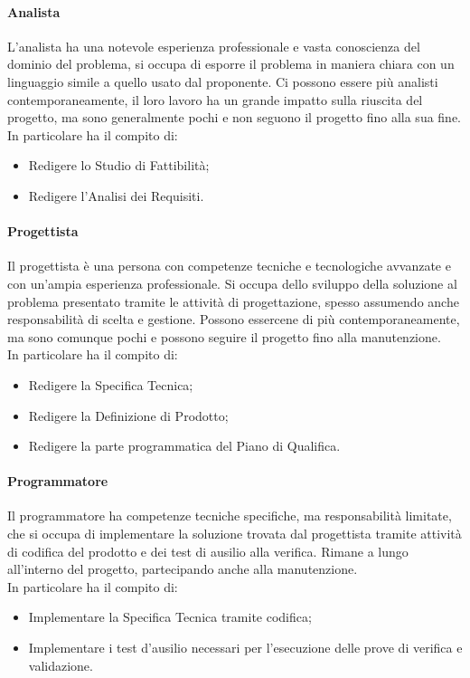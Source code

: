 \documentclass[../norme-di-progetto.tex]{subfiles}
\begin{document}
        \paragraph{Analista}
        L'analista ha una notevole esperienza professionale e vasta conoscienza del dominio del problema, si occupa di esporre il problema in maniera chiara con un linguaggio simile a quello usato dal proponente. Ci possono essere più analisti contemporaneamente, il loro lavoro ha un grande impatto sulla riuscita del progetto, ma sono generalmente pochi e non seguono il progetto fino alla sua fine.\\
        In particolare ha il compito di:
        \begin{itemize} 
            \item Redigere lo Studio di Fattibilità;
            \item Redigere l'Analisi dei Requisiti.
        \end{itemize}

        \paragraph{Progettista}
        Il progettista è una persona con competenze tecniche e tecnologiche avvanzate e con un'ampia esperienza professionale. Si occupa dello sviluppo della soluzione al problema presentato tramite le attività di progettazione, spesso assumendo anche responsabilità di scelta e gestione. Possono essercene di più contemporaneamente, ma sono comunque pochi e possono seguire il progetto fino alla manutenzione.\\
        In particolare ha il compito di:
        \begin{itemize}
            \item Redigere la Specifica Tecnica;
            \item Redigere la Definizione di Prodotto;
            \item Redigere la parte programmatica del Piano di Qualifica.
        \end{itemize}

        \paragraph{Programmatore}
        Il programmatore ha competenze tecniche specifiche, ma responsabilità limitate, che si occupa di implementare la soluzione trovata dal progettista tramite attività di codifica del prodotto e dei test di ausilio alla verifica. Rimane a lungo all'interno del progetto, partecipando anche alla manutenzione.\\
        In particolare ha il compito di:
        \begin{itemize}
            \item Implementare la Specifica Tecnica tramite codifica;
            \item Implementare i test d'ausilio necessari per l'esecuzione delle prove di verifica e validazione.
        \end{itemize}
\end{document}
